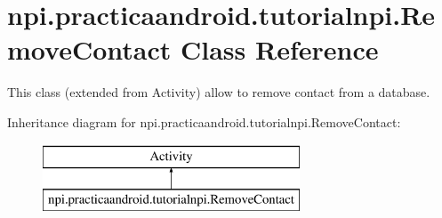\hypertarget{classnpi_1_1practicaandroid_1_1tutorialnpi_1_1_remove_contact}{\section{npi.\-practicaandroid.\-tutorialnpi.\-Remove\-Contact Class Reference}
\label{classnpi_1_1practicaandroid_1_1tutorialnpi_1_1_remove_contact}
}


This class (extended from Activity) allow to remove contact from a database.  


Inheritance diagram for npi.\-practicaandroid.\-tutorialnpi.\-Remove\-Contact\-:\begin{figure}[H]
\begin{center}
\leavevmode
\includegraphics[height=2.000000cm]{classnpi_1_1practicaandroid_1_1tutorialnpi_1_1_remove_contact}
\end{center}
\end{figure}
